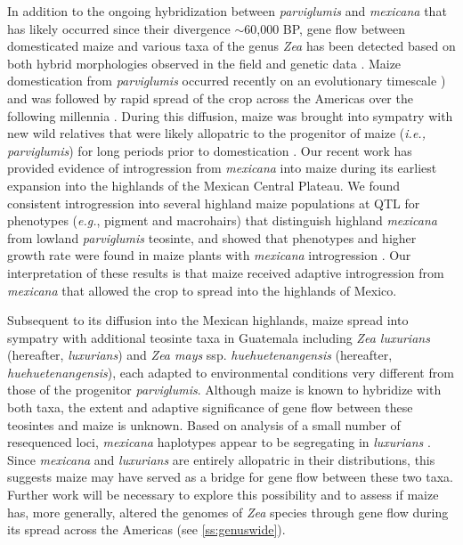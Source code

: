 In addition to the ongoing hybridization between \emph{parviglumis} and \emph{mexicana} that has likely occurred since their divergence $\sim$60,000 BP, gene flow between domesticated maize and various taxa of the genus \emph{Zea} has been detected based on both hybrid morphologies observed in the field \citep{wilkes1967teosinte, Wilkes1977} and genetic data \citep{Fukunaga2005,Ross-Ibarra2009a}. 
Maize domestication from \emph{parviglumis} occurred recently on an evolutionary timescale \citep[$\sim$9,000BP][]{Matsuoka2002}) and was followed by rapid spread of the crop across the Americas over the following millennia \citep{Piperno2001,Grobman2012}. 
During this diffusion, maize was brought into sympatry with new wild relatives that were likely allopatric to the progenitor of maize (\emph{i.e., parviglumis}) for long periods prior to domestication \citep{hufford2012inferences}. 
Our recent work has provided evidence of introgression from \emph{mexicana} into maize during its earliest expansion into the highlands of the Mexican Central Plateau.  
We found consistent introgression into several highland maize populations at QTL for phenotypes (\emph{e.g.}, pigment and macrohairs) that distinguish highland \emph{mexicana} from lowland \emph{parviglumis} teosinte, and showed that \zm{} phenotypes and higher growth rate were found in maize plants with \emph{mexicana} introgression \citep{Hufford2013}.
Our interpretation of these results is that maize received adaptive introgression from \emph{mexicana} that allowed the crop to spread into the highlands of Mexico. 

Subsequent to its diffusion into the Mexican highlands, maize spread into sympatry with additional teosinte taxa in Guatemala including \emph{Zea luxurians} (hereafter, \emph{luxurians}) and \emph{Zea mays} ssp. \emph{huehuetenangensis} (hereafter, \emph{huehuetenangensis}), each adapted to environmental conditions very different from those of the progenitor \emph{parviglumis}. 
Although maize is known to hybridize with both taxa, the extent and adaptive significance of gene flow between these teosintes and maize is unknown.  
Based on analysis of a small number of resequenced loci, \emph{mexicana} haplotypes appear to be segregating in \emph{luxurians} \citep{Ross-Ibarra2009a}.  
Since \emph{mexicana} and \emph{luxurians} are entirely allopatric in their distributions, this suggests maize may have served as a bridge for gene flow between these two taxa.  
Further work will be necessary to explore this possibility and to assess if maize has, more generally, altered the genomes of \emph{Zea} species through gene flow during its spread across the Americas (see \ref{ss:genuswide}).

